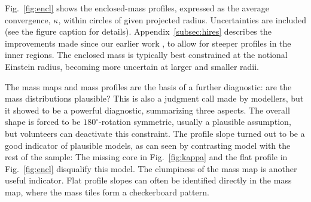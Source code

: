 Fig.~\ref{fig:encl} shows the enclosed-mass profiles, expressed as the
average convergence, $\kappa$, within circles of given projected
radius.  Uncertainties are included (see the figure caption for
details).
Appendix~\ref{subsec:hires} describes the improvements made
since our earlier work \citep{2015MNRAS.447.2170K}, to allow for
steeper profiles in the inner regions.  The enclosed mass is typically
best constrained at the notional Einstein radius, becoming more
uncertain at larger and smaller radii.

The mass maps and mass profiles are the basis of a further diagnostic:
are the mass distributions plausible? This is also a judgment call
made by modellers, but it showed to be a powerful diagnostic,
summarizing three aspects. The overall shape is forced to be
$180^\circ$-rotation symmetric, usually a plausible assumption, but
volunteers can deactivate this constraint. The profile slope turned
out to be a good indicator of plausible models, as can seen by
contrasting model  with the rest of the sample:  The missing
core in Fig.~\ref{fig:kappa} and the flat profile in
Fig.~\ref{fig:encl} disqualify this model. The clumpiness of the
mass map is another useful indicator. Flat profile slopes can often be
identified directly in the mass map, where the mass tiles form a
checkerboard pattern.


